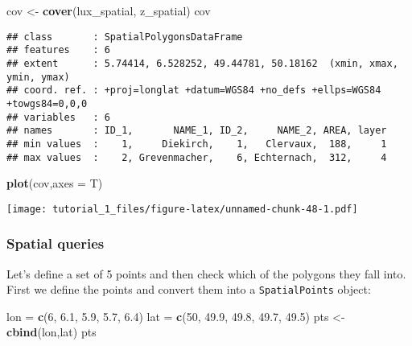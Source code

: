 \documentclass[]{article}
\newenvironment{Shaded}{\begin{snugshade}}{\end{snugshade}}
\newcommand{\DataTypeTok}[1]{\textcolor[rgb]{0.13,0.29,0.53}{#1}}
\newcommand{\DecValTok}[1]{\textcolor[rgb]{0.00,0.00,0.81}{#1}}
\newcommand{\FloatTok}[1]{\textcolor[rgb]{0.00,0.00,0.81}{#1}}
\newcommand{\KeywordTok}[1]{\textcolor[rgb]{0.13,0.29,0.53}{\textbf{#1}}}
\newcommand{\NormalTok}[1]{#1}
\newcommand{\StringTok}[1]{\textcolor[rgb]{0.31,0.60,0.02}{#1}}
\begin{document}
\begin{Shaded}
\begin{Highlighting}[]
\NormalTok{cov <-}\StringTok{ }\KeywordTok{cover}\NormalTok{(lux_spatial, z_spatial)}
\NormalTok{cov}
\end{Highlighting}
\end{Shaded}

\begin{verbatim}
## class       : SpatialPolygonsDataFrame 
## features    : 6 
## extent      : 5.74414, 6.528252, 49.44781, 50.18162  (xmin, xmax, ymin, ymax)
## coord. ref. : +proj=longlat +datum=WGS84 +no_defs +ellps=WGS84 +towgs84=0,0,0 
## variables   : 6
## names       : ID_1,       NAME_1, ID_2,     NAME_2, AREA, layer 
## min values  :    1,     Diekirch,    1,   Clervaux,  188,     1 
## max values  :    2, Grevenmacher,    6, Echternach,  312,     4
\end{verbatim}

\begin{Shaded}
\begin{Highlighting}[]
\KeywordTok{plot}\NormalTok{(cov,}\DataTypeTok{axes =}\NormalTok{ T)}
\end{Highlighting}
\end{Shaded}

\texttt{[image: tutorial\_1\_files/figure-latex/unnamed-chunk-48-1.pdf]}

\hypertarget{spatial-queries}{%
\subsubsection{Spatial queries}\label{spatial-queries}}

Let's define a set of 5 points and then check which of the polygons they
fall into. First we define the points and convert them into a
\texttt{SpatialPoints} object:

\begin{Shaded}
\begin{Highlighting}[]
\NormalTok{lon =}\StringTok{ }\KeywordTok{c}\NormalTok{(}\DecValTok{6}\NormalTok{, }\FloatTok{6.1}\NormalTok{, }\FloatTok{5.9}\NormalTok{, }\FloatTok{5.7}\NormalTok{, }\FloatTok{6.4}\NormalTok{)}
\NormalTok{lat =}\StringTok{ }\KeywordTok{c}\NormalTok{(}\DecValTok{50}\NormalTok{, }\FloatTok{49.9}\NormalTok{, }\FloatTok{49.8}\NormalTok{, }\FloatTok{49.7}\NormalTok{, }\FloatTok{49.5}\NormalTok{)}
\NormalTok{pts <-}\StringTok{ }\KeywordTok{cbind}\NormalTok{(lon,lat)}
\NormalTok{pts}
\end{Highlighting}
\end{Shaded}
\end{document}
